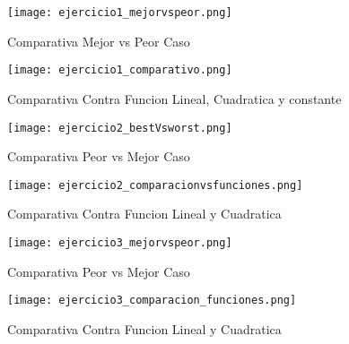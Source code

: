 
 \begin{figure}[h!]
    \texttt{[image: ejercicio1\_mejorvspeor.png]}
    \centering
    \caption{Comparativa Mejor vs Peor Caso}
    \label{overflow3}
    \end{figure}

    \begin{figure}[h!]
    \texttt{[image: ejercicio1\_comparativo.png]}
    \centering
    \caption{Comparativa Contra Funcion Lineal, Cuadratica y constante}
    \label{overflow3}
    \end{figure}
    
    
    \begin{figure}[h!]
\texttt{[image: ejercicio2\_bestVsworst.png]}
\centering
\caption{Comparativa Peor vs Mejor Caso}
\label{overflow3}
\end{figure}


\begin{figure}[h!]
\texttt{[image: ejercicio2\_comparacionvsfunciones.png]}
\centering
\caption{Comparativa Contra Funcion Lineal y Cuadratica}
\label{overflow3}
\end{figure}

\begin{figure}[h!]
\texttt{[image: ejercicio3\_mejorvspeor.png]}
\centering
\caption{Comparativa Peor vs Mejor Caso}
\label{overflow3}
\end{figure}


\begin{figure}[h!]
\texttt{[image: ejercicio3\_comparacion\_funciones.png]}
\centering
\caption{Comparativa Contra Funcion Lineal y Cuadratica}
\label{overflow3}
\end{figure}
